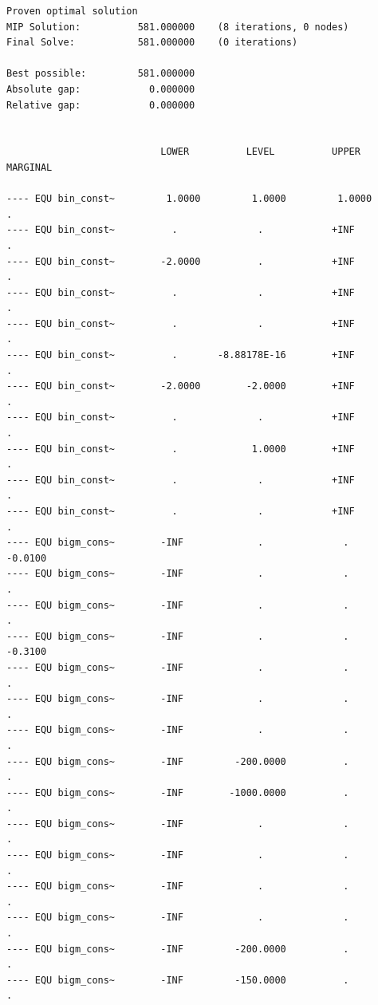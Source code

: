 \documentclass[11pt]{article}
\begin{document}
\begin{verbatim}
Proven optimal solution
MIP Solution:          581.000000    (8 iterations, 0 nodes)
Final Solve:           581.000000    (0 iterations)

Best possible:         581.000000
Absolute gap:            0.000000
Relative gap:            0.000000


                           LOWER          LEVEL          UPPER         MARGINAL

---- EQU bin_const~         1.0000         1.0000         1.0000          .          
---- EQU bin_const~          .              .            +INF             .          
---- EQU bin_const~        -2.0000          .            +INF             .          
---- EQU bin_const~          .              .            +INF             .          
---- EQU bin_const~          .              .            +INF             .          
---- EQU bin_const~          .       -8.88178E-16        +INF             .          
---- EQU bin_const~        -2.0000        -2.0000        +INF             .          
---- EQU bin_const~          .              .            +INF             .          
---- EQU bin_const~          .             1.0000        +INF             .          
---- EQU bin_const~          .              .            +INF             .          
---- EQU bin_const~          .              .            +INF             .          
---- EQU bigm_cons~        -INF             .              .            -0.0100      
---- EQU bigm_cons~        -INF             .              .              .          
---- EQU bigm_cons~        -INF             .              .              .          
---- EQU bigm_cons~        -INF             .              .            -0.3100      
---- EQU bigm_cons~        -INF             .              .              .          
---- EQU bigm_cons~        -INF             .              .              .          
---- EQU bigm_cons~        -INF             .              .              .          
---- EQU bigm_cons~        -INF         -200.0000          .              .          
---- EQU bigm_cons~        -INF        -1000.0000          .              .          
---- EQU bigm_cons~        -INF             .              .              .          
---- EQU bigm_cons~        -INF             .              .              .          
---- EQU bigm_cons~        -INF             .              .              .          
---- EQU bigm_cons~        -INF             .              .              .          
---- EQU bigm_cons~        -INF         -200.0000          .              .          
---- EQU bigm_cons~        -INF         -150.0000          .              .          

\end{verbatim}
\end{document}
